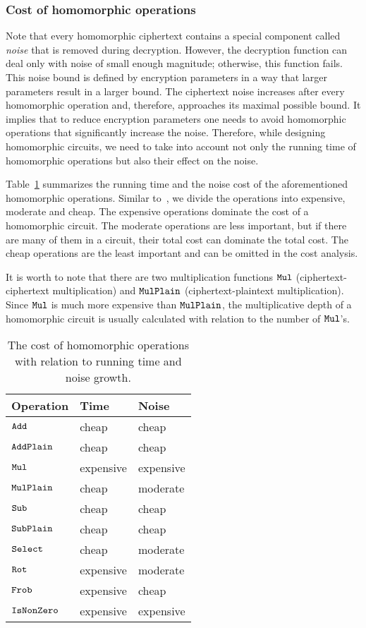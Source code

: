 \subsubsection{Cost of homomorphic operations}\label{subsec:cost}
Note that every homomorphic ciphertext contains a special component called \emph{noise} that is removed during decryption.
However, the decryption function can deal only with noise of small enough magnitude; otherwise, this function fails.
This noise bound is defined by encryption parameters in a way that larger parameters result in a larger bound.
The ciphertext noise increases after every homomorphic operation and, therefore, approaches its maximal possible bound.
It implies that to reduce encryption parameters one needs to avoid homomorphic operations that significantly increase the noise.
Therefore, while designing homomorphic circuits, we need to take into account not only the running time of homomorphic operations but also their effect on the noise.  

Table~\ref{table:he_operations} summarizes the running time and the noise cost of the aforementioned homomorphic operations.
Similar to~\cite{C:HalSho14}, we divide the operations into expensive, moderate and cheap.
The expensive operations dominate the cost of a homomorphic circuit.
The moderate operations are less important, but if there are many of them in a circuit, their total cost can dominate the total cost.
The cheap operations are the least important and can be omitted in the cost analysis.

It is worth to note that there are two multiplication functions ${\mathtt{Mul}}$ (ciphertext-ciphertext multiplication) and ${\mathtt{MulPlain}}$ (ciphertext-plaintext multiplication).
Since ${\mathtt{Mul}}$ is much more expensive than ${\mathtt{MulPlain}}$, the multiplicative depth of a homomorphic circuit is usually calculated with relation to the number of ${\mathtt{Mul}}$'s.

\begin{table}[t!]
  \centering
  \begin{tabular*}{6.5cm}{ p{2cm} p{2cm} p{2cm} }
    \toprule
    Operation	& Time			& Noise \\
    \midrule
    ${\mathtt{Add}}$		& cheap			& cheap 	\\
    ${\mathtt{AddPlain}}$	& cheap			& cheap \\
    ${\mathtt{Mul}}$		& expensive		& expensive 	\\
    ${\mathtt{MulPlain}}$	& cheap			& moderate 	\\
    ${\mathtt{Sub}}$		& cheap			& cheap  \\
    ${\mathtt{SubPlain}}$	& cheap			& cheap  \\
    ${\mathtt{Select}}$	& cheap			& moderate \\
    ${\mathtt{Rot}}$ 	 & expensive	& moderate \\
    ${\mathtt{Frob}}$		 & expensive	& cheap \\
    ${\mathtt{IsNonZero}}$ & expensive    & expensive \\
    \bottomrule
  \end{tabular*}
  \caption{The cost of homomorphic operations with relation to running time and noise growth.}
  \label{table:he_operations}
\end{table}


